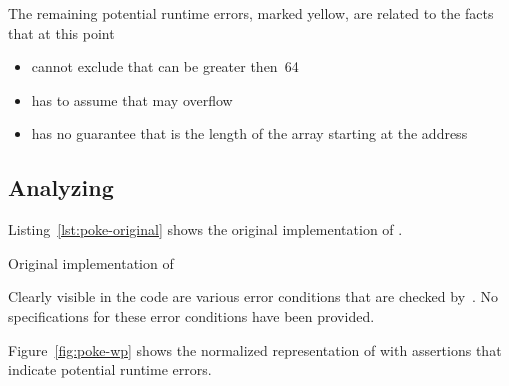 The remaining potential runtime errors, marked yellow, are related to the facts that at this point \framacwp
\begin{itemize}
\item cannot exclude that  can be greater then~64 
\item has to assume that  may overflow
\item has no guarantee that  is the length 
      of the array starting at the address 
\end{itemize}

\clearpage

\subsection{Analyzing \poke}

Listing~\ref{lst:poke-original} shows the original implementation of \poke.

\begin{listing}[hbt]
\begin{minipage}{\textwidth}

\end{minipage}
\caption{\label{lst:poke-original} Original implementation of \poke}
\end{listing}

Clearly visible in the code are various error conditions that are checked 
by~\poke.
No specifications for these error conditions have been provided.
 
\clearpage


Figure~\ref{fig:poke-wp} shows the normalized representation of \poke
with \acsl assertions that indicate potential runtime errors.

